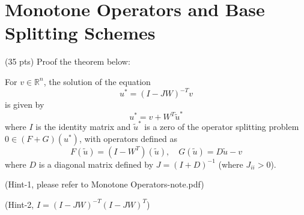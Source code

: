\section{Monotone Operators and Base Splitting Schemes}
{\color{red} (35 pts)}
Proof the theorem below:
\begin{theorem}
For \(v \in \mathbb{R}^n\), the solution of the equation
\begin{equation}
u^* = (I - JW)^{-T}v
\end{equation}
is given by
\begin{equation}
u^* = v + W^T\tilde{u}^*
\end{equation}
where $I$ is the identity matrix and \(\tilde{u}^*\) is a zero of the operator splitting problem \(0 \in (F + G)(u^*)\), with operators defined as
\begin{equation}
F(\tilde{u}) = (I - W^T)(\tilde{u}), \quad G(\tilde{u}) = D\tilde{u} - v
\end{equation}
where \(D\) is a diagonal matrix defined by \(J = (I + D)^{-1}\) (where \( J_{ii} > 0 \)).
\end{theorem}
(Hint-1, please refer to Monotone Operators-note.pdf)
\par
(Hint-2, $I = (I-J W)^{-T} (I-J W)^{T}$)


\solution{}





